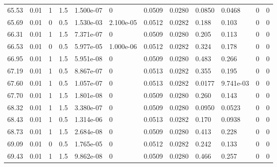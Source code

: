 \documentclass[preview]{standalone}
\begin{document}
{{{{{\begin{tabular}{L{1.2cm}C{1.2cm} C{0.3cm}C{0.5cm} C{1.4cm}C{1.4cm} C{1.4cm}C{1.4cm} C{1.6cm}C{1.6cm} C{1.6cm}C{1.6cm}}
  65.53  &  0.01  & 1     & 1.5 &  1.500e-07  & 0  &  0.0509&   0.0280& 0.0850 & 0.0468   &  0 & 0  \\ 
  65.69  &  0.01  & 0     & 0.5 &  1.530e-03  & 2.100e-05  &  0.0512&   0.0282& 0.188 & 0.103   &  0 & 0  \\ 
  66.31  &  0.01  & 1     & 1.5 &  7.371e-07  & 0  &  0.0509&   0.0280& 0.205 & 0.113   &  0 & 0  \\ 
  66.53  &  0.01  & 0     & 0.5 &  5.977e-05  & 1.000e-06  &  0.0512&   0.0282& 0.324 & 0.178   &  0 & 0  \\ 
  66.95  &  0.01  & 1     & 1.5 &  5.951e-08  & 0  &  0.0509&   0.0280& 0.483 & 0.266   &  0 & 0  \\ 
  67.19  &  0.01  & 1     & 0.5 &  8.867e-07  & 0  &  0.0513&   0.0282& 0.355 & 0.195   &  0 & 0  \\ 
  67.60  &  0.01  & 1     & 0.5 &  1.057e-07  & 0  &  0.0513&   0.0282& 0.0177 & 9.741e-03   &  0 & 0  \\ 
  67.70  &  0.01  & 1     & 1.5 &  1.801e-08  & 0  &  0.0509&   0.0280& 0.260 & 0.143   &  0 & 0  \\ 
  68.32  &  0.01  & 1     & 1.5 &  3.380e-07  & 0  &  0.0509&   0.0280& 0.0950 & 0.0523   &  0 & 0  \\ 
  68.43  &  0.01  & 1     & 0.5 &  1.314e-06  & 0  &  0.0513&   0.0282& 0.170 & 0.0938   &  0 & 0  \\ 
  68.73  &  0.01  & 1     & 1.5 &  2.684e-08  & 0  &  0.0509&   0.0280& 0.413 & 0.228   &  0 & 0  \\ 
  69.09  &  0.01  & 0     & 0.5 &  1.765e-05  & 0  &  0.0512&   0.0282& 0.242 & 0.133   &  0 & 0  \\ 
  69.43  &  0.01  & 1     & 1.5 &  9.862e-08  & 0  &  0.0509&   0.0280& 0.466 & 0.257   &  0 & 0  \\ 
\hline 
\end{tabular} 

}}}}}
\end{document}

